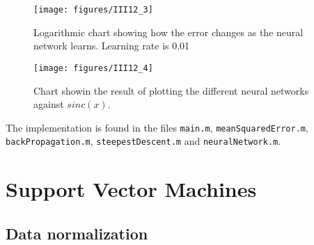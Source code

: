 \documentclass[a4paper, 11pt]{article}
\begin{document}
\begin{figure}[H]
    \centering
    \texttt{[image: figures/III12\_3]}
    \caption{Logarithmic chart showing how the error changes as the neural network learns. Learning rate is 0.01}
    \label{fig:III12_3}
\end{figure}

\begin{figure}[H]
    \centering
    \texttt{[image: figures/III12\_4]}
    \caption{Chart showin the result of plotting the different neural networks against $sinc(x)$.}
    \label{fig:III12_4}
\end{figure}

The implementation is found in the files \texttt{main.m}, \texttt{meanSquaredError.m},  \texttt{backPropagation.m}, \texttt{steepestDescent.m} and \texttt{neuralNetwork.m}.

\section{Support Vector Machines}
\subsection{Data normalization}
\end{document}
